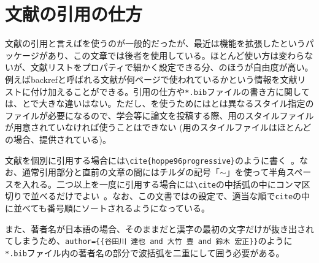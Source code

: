 \section{文献の引用の仕方}
\label{sec:cite-articles}

文献の引用と言えば\bibtex を使うのが一般的だったが、最近は機能を拡張した\biblatex というパッケージがあり、この文章では後者を使用している。ほとんど使い方は変わらないが、文献リストをプロパティで細かく設定できる分、\biblatex のほうが自由度が高い。例えばbackrefと呼ばれる文献が何ページで使われているかという情報を文献リストに付け加えることができる。引用の仕方や\texttt{*.bib}ファイルの書き方に関しては、\bibtex と\biblatex で大きな違いはない。ただし、\biblatex を使うためには\bibtex とは異なるスタイル指定のファイルが必要になるので、学会等に論文を投稿する際、\biblatex 用のスタイルファイルが用意されていなければ使うことはできない (\bibtex 用のスタイルファイルはほとんどの場合、提供されている)。

文献を個別に引用する場合には\texttt{\textbackslash cite\{hoppe96progressive\}}のように書く~\cite{hoppe96progressive}。なお、通常引用部分と直前の文章の間にはチルダの記号「$\sim$」を使って半角スペースを入れる。二つ以上を一度に引用する場合には\texttt{\textbackslash cite}の中括弧の中にコンマ区切りで並べるだけでよい~\cite{garland97surface,kazhdan06poisson, hoppe96progressive,qi2017pointnetpp}。なお、この文書では\biblatex の設定で、適当な順で\texttt{cite}の中に並べても番号順にソートされるようになっている。

また、著者名が日本語の場合、そのままだと漢字の最初の文字だけが抜き出されてしまうため、\texttt{author=\{\{谷田川 達也 and 大竹 豊 and 鈴木 宏正\}\}}のように\texttt{*.bib}ファイル内の著者名の部分で波括弧を二重にして囲う必要がある。
